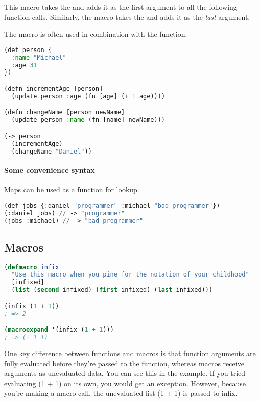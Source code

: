 This macro takes the  and adds it as the first argument to all the following function calls. Similarly, the \inlinecode{->>} macro takes the  and adds it as the \emph{last} argument. 

The \inlinecode{->} macro is often used in combination with the  function. 

\begin{lstlisting}[language=lisp]
(def person {
  :name "Michael"
  :age 31
})

(defn incrementAge [person]
  (update person :age (fn [age] (+ 1 age))))

(defn changeName [person newName] 
  (update person :name (fn [name] newName)))

(-> person
  (incrementAge)
  (changeName "Daniel"))

\end{lstlisting}

\paragraph{Some convenience syntax} Maps can be used as a function for lookup.
\begin{lstlisting}[language=lisp]
(def jobs {:daniel "programmer" :michael "bad programmer"})
(:daniel jobs) // -> "programmer"
(jobs :michael) // -> "bad programmer"
\end{lstlisting}

\subsection{Macros}

\begin{lstlisting}[language=lisp]
(defmacro infix
  "Use this macro when you pine for the notation of your childhood"
  [infixed]
  (list (second infixed) (first infixed) (last infixed)))

(infix (1 + 1))
; => 2

(macroexpand '(infix (1 + 1)))
; => (+ 1 1)
\end{lstlisting}

One key difference between functions and macros is that function arguments are fully evaluated before they’re passed to the function, whereas macros receive arguments as unevaluated data. You can see this in the example. If you tried evaluating (1 + 1) on its own, you would get an exception. However, because you’re making a macro call, the unevaluated list (1 + 1) is passed to infix.

